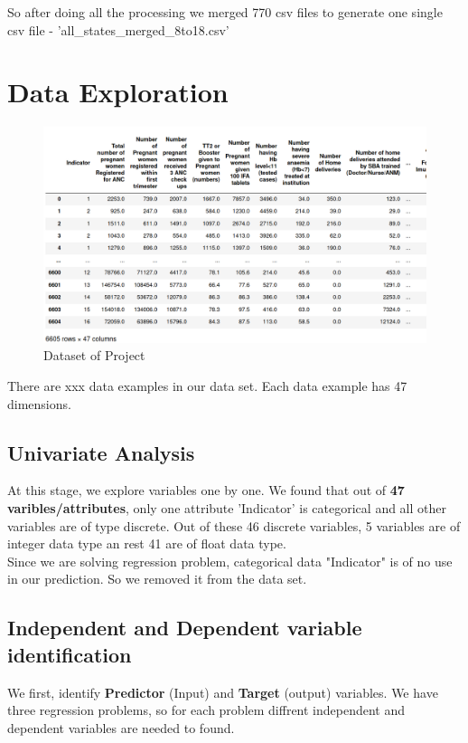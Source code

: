 \documentclass[12pt]{article}
\begin{document}
So after doing all the processing we merged 770 csv files to generate one single csv file - 'all\_states\_merged\_8to18.csv'

\newpage
\section{Data Exploration}

\begin{figure}[h]
	\hspace{-1cm}
	\includegraphics[scale=0.4]{images/data.png}
	\caption{Dataset of Project}
\end{figure}

There are xxx data examples in our data set. Each data example has 47 dimensions.

\subsection{Univariate Analysis}

At this stage, we explore variables one by one. We found that out of \textbf{47 varibles/attributes}, only one attribute 'Indicator' is categorical and all other variables are of type discrete. Out of these 46 discrete variables, 5 variables are of integer data type an rest 41 are of float data type.\\
Since we are solving regression problem, categorical data "Indicator" is of no use in our prediction. So we removed it from the data set.

\subsection{Independent and Dependent variable identification}
We first, identify \textbf{Predictor }(Input) and \textbf{Target }(output) variables. We have three regression problems, so for each problem diffrent independent and dependent variables are needed to found.\\
\end{document}
